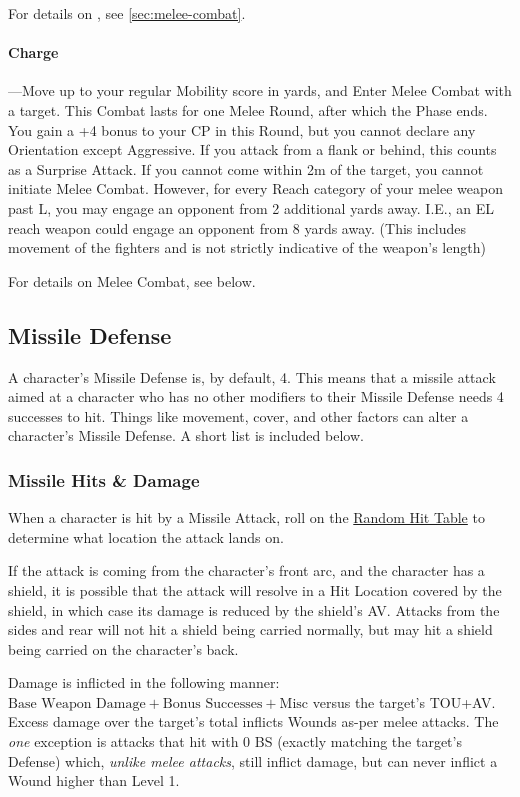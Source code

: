 \documentclass[oneside,11pt,english]{book}
\begin{document}
For details on , see \autoref{sec:melee-combat}.

\paragraph{\label{par:Charge} Charge}
---\quad Move up to your regular Mobility score in yards, and Enter Melee Combat
with a target. This Combat lasts for one Melee Round, after which the Phase
ends. You gain a +4 bonus to your CP in this Round, but you cannot declare any
Orientation except Aggressive. If you attack from a flank or behind, this counts
as a Surprise Attack. If you cannot come within 2m of the target, you cannot
initiate Melee Combat. However, for every Reach category of your melee weapon
past L, you may engage an opponent from 2 additional yards away. I.E., an EL
reach weapon could engage an opponent from 8 yards away. (This includes movement
of the fighters and is not strictly indicative of the weapon’s length)

For details on Melee Combat, see below. 

\subsection{Missile Defense}
A character’s Missile Defense is, by default, 4. This means that a missile
attack aimed at a character who has no other modifiers to their Missile Defense
needs 4 successes to hit. Things like movement, cover, and other factors can
alter a character’s Missile Defense. A short list is included below.

\subsubsection{Missile Hits \& Damage}
When a character is hit by a Missile Attack, roll on the \hyperref[tab:Missile
Target Zones]{Random Hit Table} to determine what location the attack lands on.

If the attack is coming from the character’s front arc, and the character has a
shield, it is possible that the attack will resolve in a Hit Location covered by
the shield, in which case its damage is reduced by the shield’s AV. Attacks from
the sides and rear will not hit a shield being carried normally, but may hit a
shield being carried on the character’s back. 

Damage is inflicted in the following manner:
$\text{Base~Weapon~Damage}+\text{Bonus~Successes}+\text{Misc}$ versus the
target’s TOU+AV. Excess damage over the target’s total inflicts Wounds as-per
melee attacks. The \emph{one} exception is attacks that hit with 0 BS (exactly
matching the target’s Defense) which, \emph{unlike melee attacks}, still inflict
damage, but can never inflict a Wound higher than Level 1.   
\end{document}
